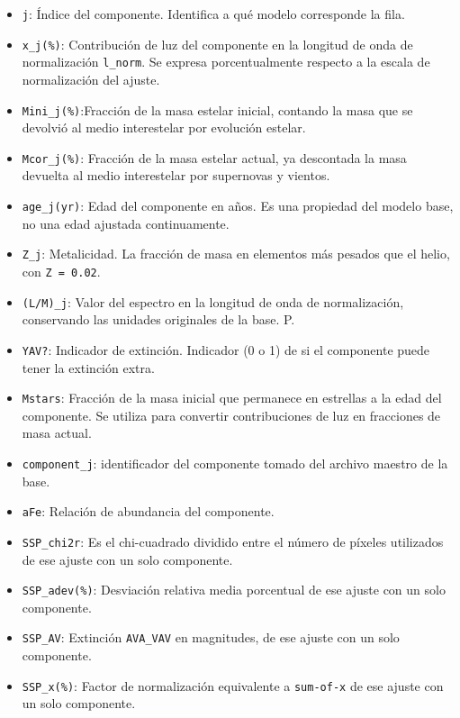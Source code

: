 \documentclass[12pt]{article}
\begin{document}
\begin{itemize}
    \item \texttt{j}: Índice del componente. Identifica a qué modelo corresponde la fila.
    \item \texttt{x\_j(\%)}: Contribución de luz del componente en la longitud de onda de normalización \texttt{l\_norm}. Se expresa porcentualmente respecto a la escala de normalización del ajuste.
    \item \texttt{Mini\_j(\%)}:Fracción de la masa estelar inicial, contando la masa que se devolvió al medio interestelar por evolución estelar.
    \item \texttt{Mcor\_j(\%)}: Fracción de la masa estelar actual, ya descontada la masa devuelta al medio interestelar por supernovas y vientos.
    \item \texttt{age\_j(yr)}: Edad del componente en años. Es una propiedad del modelo base, no una edad ajustada continuamente.
    \item \texttt{Z\_j}: Metalicidad. La fracción de masa en elementos más pesados que el helio, con \texttt{Z = 0.02}.
    \item \texttt{(L/M)\_j}: Valor del espectro en la longitud de onda de normalización, conservando las unidades originales de la base. P.
    \item \texttt{YAV?}: Indicador de extinción. Indicador (0 o 1) de si el componente puede tener la extinción extra.
    \item \texttt{Mstars}: Fracción de la masa inicial que permanece en estrellas a la edad del componente. Se utiliza para convertir contribuciones de luz en fracciones de masa actual.
    \item \texttt{component\_j}: identificador del componente tomado del archivo maestro de la base.
    \item \texttt{a\/Fe}: Relación de abundancia del componente.
    \item \texttt{SSP\_chi2r}: Es el chi-cuadrado dividido entre el número de píxeles utilizados de ese ajuste con un solo componente.
    \item \texttt{SSP\_adev(\%)}: Desviación relativa media porcentual de ese ajuste con un solo componente.
    \item \texttt{SSP\_AV}: Extinción \texttt{AVA\_VAV} en magnitudes, de ese ajuste con un solo componente.
    \item \texttt{SSP\_x(\%)}: Factor de normalización equivalente a \texttt{sum-of-x} de ese ajuste con un solo componente.
\end{itemize}
\end{document}
